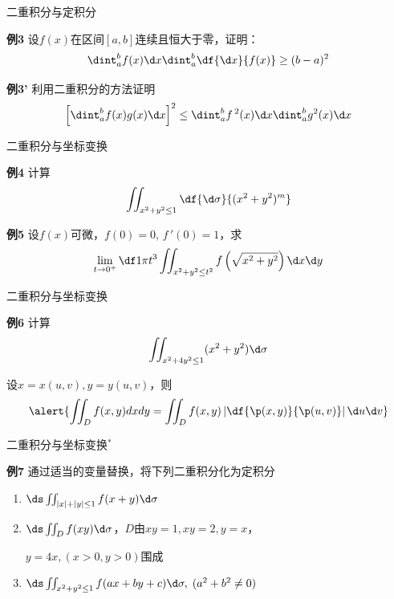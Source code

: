 \begin{frame}{二重积分与定积分}
	\linespread{1.2}\pause 
	\begin{exampleblock}{{\bf 例3}\hfill}
		设$f(x)$在区间$[a,b]$连续且恒大于零，证明：
		$$\dint_a^bf(x)\d x\dint_a^b\df{\d x}{f(x)}\geq (b-a)^2$$
	\end{exampleblock}
	\bigskip\pause 
	\begin{exampleblock}{{\bf 例3'}\hfill}
		利用二重积分的方法证明
		$$\left[\dint_a^bf(x)g(x)\d x\right]^2\leq
		\dint_a^bf\,^2(x)\d x\dint_a^bg^2(x)\d x$$
	\end{exampleblock}
\end{frame}

\begin{frame}{二重积分与坐标变换}
	\linespread{1.2}\pause 
	\begin{exampleblock}{{\bf 例4}\hfill}
		计算
		$$\iint_{x^2+y^2\leq 1}\df{\d\sigma}{(x^2+y^2)^m}$$
	\end{exampleblock}\pause 
	\begin{exampleblock}{{\bf 例5}\hfill}
		设$f(x)$可微，$f(0)=0,\,f\,'(0)=1$，求
		$$\lim\limits_{t\to 0^+}\df 1{\pi t^3}
		\iint_{x^2+y^2\leq t^2}f\left(
		\sqrt{x^2+y^2}\right)\d x\d y$$
	\end{exampleblock}
\end{frame}

\begin{frame}{二重积分与坐标变换}
	\linespread{1.2}
	\begin{exampleblock}{{\bf 例6}\hfill}
		计算
		$$\iint_{x^2+4y^2\leq 1}(x^2+y^2)\d\sigma$$
	\end{exampleblock}
	\pause
	\alert{设$x=x(u,v),y=y(u,v)$，\pause 则}
	$$\alert{\iint_Df(x,y)dxdy=\iint_D
	f(x,y)\left|\df{\p(x,y)}{\p(u,v)}\right|
	\d u\d v}$$
\end{frame}

\begin{frame}{二重积分与坐标变换$^*$}
	\linespread{1.2}\pause 
	\begin{exampleblock}{{\bf 例7}}
		通过适当的变量替换，将下列二重积分化为定积分\pause 
		\begin{enumerate}
		  \item $\ds\iint_{|x|+|y|\leq 1}f(x+y)\d\sigma$\pause 
		  \item $\ds\iint_Df(xy)\d\sigma$，$D$由$xy=1,xy=2,y=x$，
		  
		  $y=4x,(x>0,y>0)$围成\pause 
		  \item $\ds\iint_{x^2+y^2\leq 1} f(ax+by+c)\d\sigma,\;(a^2+b^2\ne 0)$
		\end{enumerate}
	\end{exampleblock}
\end{frame}

